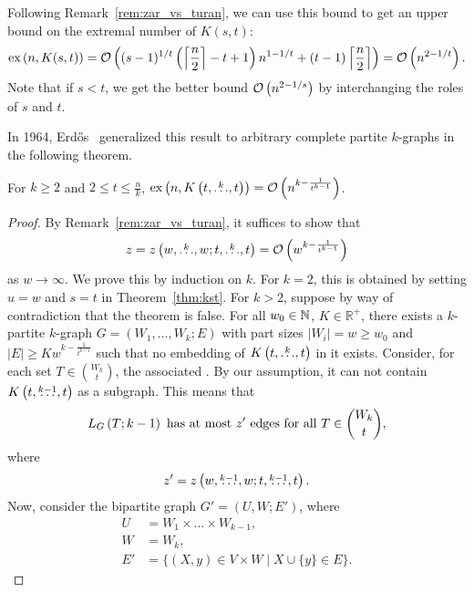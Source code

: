 \begin{remark}
    Following Remark~\ref{rem:zar_vs_turan}, we can use this bound to get an upper bound on the extremal number of $K(s, t)$:
    \[
        \text{ex} \left( n, K(s, t) \right) =
        \mathcal{O}\left((s - 1)^{1 / t}\left(\left\lceil\frac{n}{2}\right\rceil - t + 1\right)n^{1 - 1 / t} + (t - 1)\left\lceil\frac{n}{2}\right\rceil\right) =
        \mathcal{O}\left(n^{2 - 1 / t}\right).
    \]
    Note that if $s < t$, we get the better bound $\mathcal{O}\left(n^{2 - 1 / s}\right)$ by interchanging the roles of $s$ and $t$.
\end{remark}

In 1964, Erdős~\cite{Erods1964} generalized this result to arbitrary complete partite $k$-graphs in the following theorem.

\begin{theorem}\label{thm:erdos64}
    For $k \geq 2$ and $2 \leq t \leq \frac{n}{k}$,
    $\text{ex} \left( n, K\left(t, \overset{k}{\dots}, t\right) \right) = \mathcal{O}\left(n^{k - \frac{1}{t^{k-1}}}\right)$.
    \begin{proof}
        By Remark~\ref{rem:zar_vs_turan}, it suffices to show that
        \[
            z = z\left(w, \overset{k}{\dots}, w; t, \overset{k}{\dots}, t\right) = \mathcal{O}\left(w^{k - \frac{1}{t^{k-1}}}\right)
        \]
        as $w \to \infty$.
        We prove this by induction on $k$.
        For $k=2$, this is obtained by setting $u = w$ and $s = t$ in Theorem~\ref{thm:kst}.
        For $k > 2$, suppose by way of contradiction that the theorem is false.
        For all ${w_0 \in \mathbb{N}}$, ${K \in \mathbb{R}^+}$, there exists a $k$-partite $k$-graph $G = (W_1, \dots, W_k; E)$ with part sizes
        $|W_i| = w \geq w_0$ and ${|E| \geq K w^{k - \frac{1}{t^{k-1}}}}$ such that no embedding of $K\left(t, \overset{k}{\dots}, t\right)$ in it exists.
        Consider, for each set $T \in \binom{W_k}{t}$, the associated 
        .
        By our assumption, it can not contain $K\left(t, \overset{k-1}{\dots}, t\right)$ as a subgraph.
        This means that
        \begin{equation} \label{eq:conditionlink}
            L_{G}\left(T; k-1\right) \text{ has at most $z'$ edges for all } T \in \binom{W_k}{t},
        \end{equation}
        where
        \[
            z' = z\left(w, \overset{k-1}{\dots}, w; t, \overset{k-1}{\dots}, t\right).
        \]
        Now, consider the bipartite graph $G' = (U, W; E')$, where
        \begin{align*}
            U &= W_1 \times \dots \times W_{k-1}, \\
            W &= W_k, \\
            E' &= \{(X, y) \in V \times W \mid X \cup \{y\} \in E\}.

\end{align*}
\end{proof}
\end{theorem}
